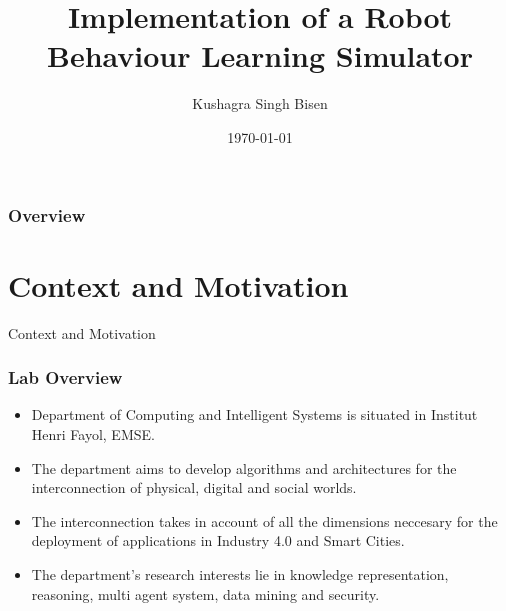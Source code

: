 \documentclass{beamer}
\title[EMSE - Stage]{Implementation of a Robot Behaviour Learning Simulator} %
\author{Kushagra Singh Bisen} %
\institute[EMSE] %
{
Ecole des Mines de Saint Etienne \\ %
\medskip
\textit{Master 1 Defence} %
}
\date{\today} %
\begin{document}
\begin{frame}
\titlepage %
\end{frame}

\begin{frame}
\frametitle{Overview} %
\tableofcontents %
\end{frame}


\section{Context and Motivation}
\begin{frame}
    \Huge{\centerline{Context and Motivation}}
\end{frame}

\begin{frame}
    \frametitle{Lab Overview}

    \begin{itemize}
        \item Department of Computing and Intelligent Systems is situated in Institut Henri Fayol, EMSE.
        \item The department aims to develop algorithms and architectures for the interconnection of physical, digital and social worlds.
        \item The interconnection takes in account of all the dimensions neccesary for the deployment of applications in Industry 4.0 and Smart Cities.
        \item The department's research interests lie in knowledge representation, reasoning, multi agent system, data mining and security.
    \end{itemize}
\end{frame}
\end{document}
